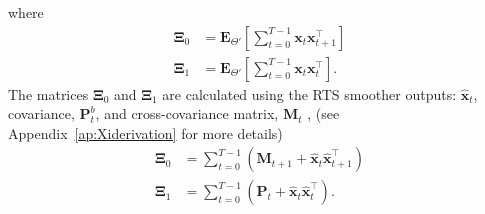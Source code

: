\documentclass[review,authoryear,3p]{elsarticle}
\begin{document}
where
\begin{align}
\boldsymbol\Xi_0&=\mathbf E_{\Theta'}\left[\sum_{t=0}^{T-1}\mathbf x_t\mathbf x_{t+1}^\top\right] \label{eq:MRA-Xi0}\\
\boldsymbol\Xi_1&=\mathbf E_{\Theta'}\left[\sum_{t=0}^{T-1}\mathbf x_t\mathbf x_{t}^\top\right] \label{eq:MRA-Xi1}.
\end{align}
The matrices $\boldsymbol\Xi_0$ and $\boldsymbol\Xi_1$ are calculated using the RTS smoother outputs: $\hat{\mathbf x}_t$, covariance, $\mathbf P_t^b$, and cross-covariance matrix, $\mathbf M_t$ \cite{Gibsona2005}, (see Appendix~\ref{ap:Xiderivation} for more details)
\begin{align}
\boldsymbol\Xi_0&=\sum_{t=0}^{T-1}\left(\mathbf M_{t+1}+\mathbf{\hat x}_t\mathbf{\hat x}_{t+1}^\top\right) \label{eq:Xi0} \\
 \boldsymbol\Xi_1&=\sum_{t=0}^{T-1}\left(\mathbf P_t+\mathbf{\hat x}_t\mathbf{\hat x}_t^\top\right).  \label{eq:Xi1}
\end{align} 
\end{document}
